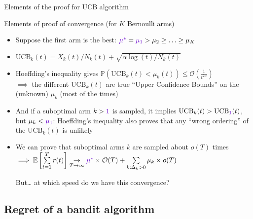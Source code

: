 \documentclass[11pt,english,ignorenonframetext,]{beamer}
\begin{document}
\begin{frame}{Elements of the proof for UCB algorithm}

  \begin{block}{Elements of proof of convergence (for $K$ Bernoulli arms)}
    \begin{itemize}[<+->]
      \item
        Suppose the first arm is the best:
        $\textcolor{deeppurple}{\mu^*} = \textcolor{deeppurple}{\mu_1} > \mu_2 \geq \ldots \geq \mu_K$
      \item
        $\mathrm{UCB}_k(t) = X_k(t) / N_k(t) + \sqrt{\alpha \log(t) / N_k(t)}$
      \item
        Hoeffding's inequality gives
        $\mathbb{P}(\mathrm{UCB}_k(t) < \mu_k(t)) \leq \mathcal{O}(\frac{1}{t^{2 \alpha}})$\\
        $\implies$ the different $\mathrm{UCB}_k(t)$ are true ``Upper Confidence Bounds'' on the (unknown) $\mu_k$ (most of the times)
      \item
        And if a suboptimal arm $k>\textcolor{deeppurple}{1}$ is sampled, it implies
        $\mathrm{UCB}_k(t) > \mathrm{UCB}_{\textcolor{deeppurple}{1}}(t)$, but $\mu_k < \textcolor{deeppurple}{\mu_1}$:
        Hoeffding's inequality also proves that any ``wrong ordering'' of the $\mathrm{UCB}_k(t)$ is unlikely
      \item
        We can prove that suboptimal arms $k$ are sampled about $o(T)$ times\\
        $\implies \mathbb{E}\left[ \sum\limits_{t=1}^T r(t) \right] \underset{T\to\infty}{\to} \textcolor{deeppurple}{\mu^*} \times \mathcal{O}(T) + \sum\limits_{k: \Delta_k>0} \mu_k \times o(T)$

        \alert{But\ldots{} at which speed do we have this convergence?}
    \end{itemize}
  \end{block}

\end{frame}


\subsection{\hfill{}Regret of a bandit algorithm\hfill{}}
\end{document}
